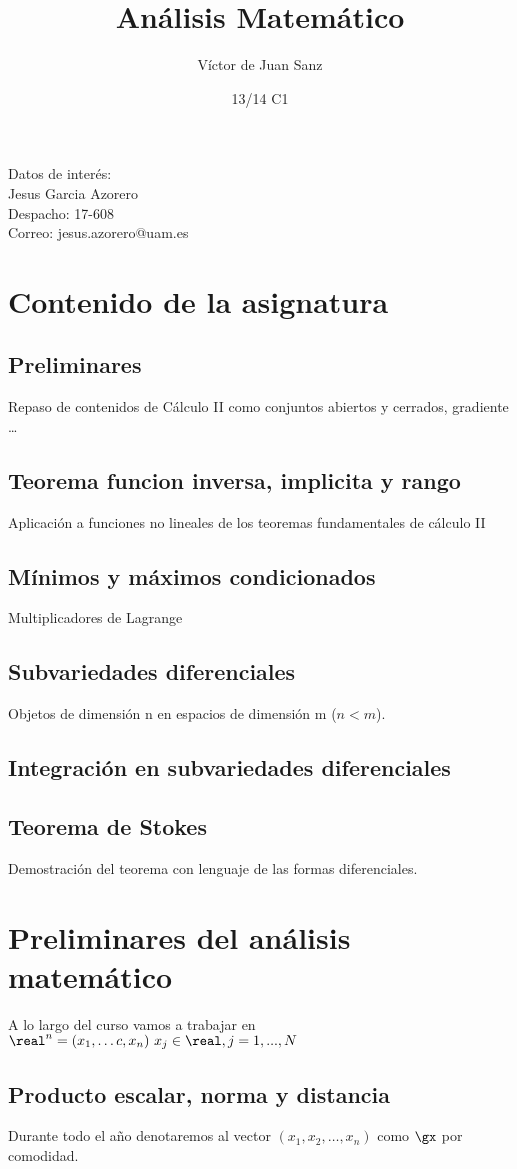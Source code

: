 \documentclass{apuntes}
\title{Análisis Matemático}
\author{Víctor de Juan Sanz}
\date{13/14 C1}
\begin{document}
\pagestyle{plain}
\maketitle
\newpage
\tableofcontents
\newpage
Datos de interés:\\
Jesus Garcia Azorero\\
Despacho: 17-608\\
Correo: jesus.azorero@uam.es


\section{Contenido de la asignatura}
\subsection{Preliminares}
Repaso de contenidos de Cálculo II como conjuntos abiertos y cerrados, gradiente \dots
\subsection{Teorema funcion inversa, implicita y rango}
Aplicación a funciones no lineales de los teoremas fundamentales de cálculo II
\subsection{Mínimos y máximos condicionados}
Multiplicadores de Lagrange
\subsection{Subvariedades diferenciales}
Objetos de dimensión n en espacios de dimensión m ($n<m$).
\subsection{Integración en subvariedades diferenciales}
\subsection{Teorema de Stokes}
Demostración del teorema con lenguaje de las formas diferenciales.
\newpage


\section{Preliminares del análisis matemático}
A lo largo del curso vamos a trabajar en $\real^n={(x_1,\dots c, x_n) \  x_j \in \real, j=1,...,N}$
\subsection{Producto escalar, norma y distancia}
Durante todo el año denotaremos al vector $(x_1,x_2,\dots,x_n)$ como $\gx$ por comodidad.
\end{document}
